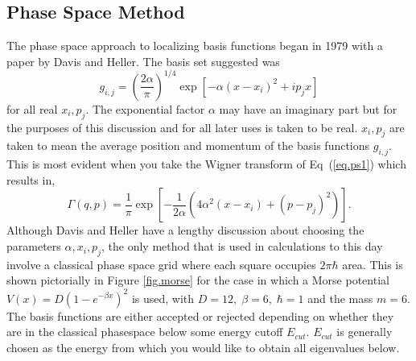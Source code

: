  \subsection{Phase Space Method}\label{sec:ps}
 The phase space approach to localizing basis functions began in 1979 with a paper by Davis and Heller\cite{Davis1979}.  The basis set suggested was  
 \begin{equation}\label{eq.ps1}
 g_{i,j}=\left(\dfrac{2\alpha}{\pi}\right)^{1/4}\exp\left[-\alpha\left(x-x_i\right)^2+i p_j x\right]
 \end{equation}
 for all real $x_i,p_j$.  The exponential factor $\alpha$ may have an imaginary part but for the purposes of this discussion and for all later uses is taken to be real. $x_i,p_j$ are taken to mean the average position and momentum of the basis functions $g_{i,j}$.  This is most evident when you take the Wigner transform of Eq~(\ref{eq.ps1}) which results in,
 \begin{equation}\label{eq.wps1}
\Gamma\left(q,p\right)=\dfrac{1}{\pi}\exp\left[-\dfrac{1}{2\alpha}\left(4\alpha^2\left(x-x_i\right)+\left(p-p_j\right)^2\right)\right].
\end{equation}
Although Davis and Heller have a lengthy discussion about choosing the parameters $\alpha,x_i,p_j$, the only method that is used in calculations to this day involve a classical phase space grid\cite{Halverson2012,Shimshovitz2012} where each square occupies $2\pi\hbar$ area. This is shown pictorially in Figure \ref{fig.morse} for the case in which a Morse potential $V\left(x\right)=D\left(1-e^{-\beta x}\right)^2$ is used, with $D=12,\;\beta=6,\;\hbar=1$ and the mass $m=6$.  The basis functions are either accepted or rejected depending on whether they are in the classical phasespace below some energy cutoff $E_{cut}$. $E_{cut}$ is generally chosen as the energy from which you would like to obtain all eigenvalues below\cite{Halverson2012}.
